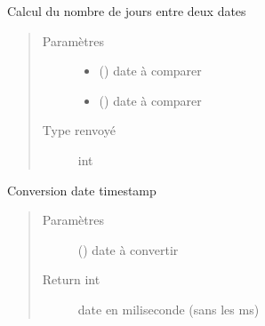\documentclass[letterpaper,10pt,french]{sphinxmanual}
\begin{document}

\begin{fulllineitems}
\label{\detokenize{modules/dtemng:toolbox.dtemng.dtediff}}
Calcul du nombre de jours entre deux dates
\begin{quote}\begin{description}
\item[{Paramètres}] \leavevmode\begin{itemize}
\item {} 
 () \textendash{} date à comparer

\item {} 
 () \textendash{} date à comparer

\end{itemize}

\item[{Type renvoyé}] \leavevmode
int

\end{description}\end{quote}

\end{fulllineitems}


\begin{fulllineitems}
\label{\detokenize{modules/dtemng:toolbox.dtemng.dtets}}
Conversion date \sphinxhyphen{} timestamp
\begin{quote}\begin{description}
\item[{Paramètres}] \leavevmode
{} () \textendash{} date à convertir

\item[{Return int}] \leavevmode
date en miliseconde (sans les ms)

\end{description}\end{quote}

\end{fulllineitems}
\end{document}
